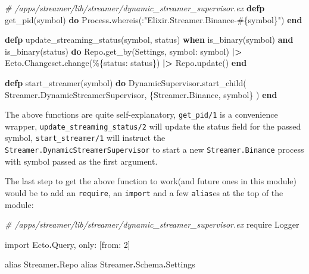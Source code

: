\documentclass[
  oneside]{book}
\newenvironment{Shaded}{\begin{snugshade}}{\end{snugshade}}
\newcommand{\CommentTok}[1]{\textcolor[rgb]{0.56,0.35,0.01}{\textit{#1}}}
\newcommand{\ConstantTok}[1]{\textcolor[rgb]{0.00,0.00,0.00}{#1}}
\newcommand{\DecValTok}[1]{\textcolor[rgb]{0.00,0.00,0.81}{#1}}
\newcommand{\ImportTok}[1]{#1}
\newcommand{\KeywordTok}[1]{\textcolor[rgb]{0.13,0.29,0.53}{\textbf{#1}}}
\newcommand{\NormalTok}[1]{#1}
\newcommand{\OperatorTok}[1]{\textcolor[rgb]{0.81,0.36,0.00}{\textbf{#1}}}
\newcommand{\OtherTok}[1]{\textcolor[rgb]{0.56,0.35,0.01}{#1}}
\newcommand{\StringTok}[1]{\textcolor[rgb]{0.31,0.60,0.02}{#1}}
\newcommand{\VariableTok}[1]{\textcolor[rgb]{0.00,0.00,0.00}{#1}}
\begin{document}
\begin{Shaded}
\begin{Highlighting}[]
\CommentTok{\# /apps/streamer/lib/streamer/dynamic\_streamer\_supervisor.ex}
  \KeywordTok{defp}\NormalTok{ get\_pid(symbol) }\KeywordTok{do}
    \ConstantTok{Process}\OperatorTok{.}\NormalTok{whereis(:}\StringTok{"Elixir.Streamer.Binance{-}}\OtherTok{\#\{}\NormalTok{symbol}\OtherTok{\}}\StringTok{"}\NormalTok{)}
  \KeywordTok{end}

  \KeywordTok{defp}\NormalTok{ update\_streaming\_status(symbol, status)}
       \KeywordTok{when}\NormalTok{ is\_binary(symbol) }\KeywordTok{and}\NormalTok{ is\_binary(status) }\KeywordTok{do}
    \ConstantTok{Repo}\OperatorTok{.}\NormalTok{get\_by(}\ConstantTok{Settings}\NormalTok{, }\VariableTok{symbol:}\NormalTok{ symbol)}
    \OperatorTok{|\textgreater{}} \ConstantTok{Ecto}\OperatorTok{.}\ConstantTok{Changeset}\OperatorTok{.}\NormalTok{change(\%\{}\VariableTok{status:}\NormalTok{ status\})}
    \OperatorTok{|\textgreater{}} \ConstantTok{Repo}\OperatorTok{.}\NormalTok{update()}
  \KeywordTok{end}

  \KeywordTok{defp}\NormalTok{ start\_streamer(symbol) }\KeywordTok{do}
    \ConstantTok{DynamicSupervisor}\OperatorTok{.}\NormalTok{start\_child(}
      \ConstantTok{Streamer}\OperatorTok{.}\ConstantTok{DynamicStreamerSupervisor}\NormalTok{,}
\NormalTok{      \{}\ConstantTok{Streamer}\OperatorTok{.}\ConstantTok{Binance}\NormalTok{, symbol\}}
\NormalTok{    )}
  \KeywordTok{end}
\end{Highlighting}
\end{Shaded}

The above functions are quite self-explanatory, \texttt{get\_pid/1} is a convenience wrapper, \texttt{update\_streaming\_status/2} will update the status field for the passed symbol, \texttt{start\_streamer/1} will instruct the \texttt{Streamer.DynamicStreamerSupervisor} to start a new \texttt{Streamer.Binance} process with symbol passed as the first argument.

The last step to get the above function to work(and future ones in this module) would be to add an \texttt{require}, an \texttt{import} and a few \texttt{alias}es at the top of the module:

\begin{Shaded}
\begin{Highlighting}[]
\CommentTok{\# /apps/streamer/lib/streamer/dynamic\_streamer\_supervisor.ex}
  \ImportTok{require} \ConstantTok{Logger}

  \ImportTok{import} \ConstantTok{Ecto}\OperatorTok{.}\ConstantTok{Query}\NormalTok{, }\VariableTok{only:}\NormalTok{ [}\VariableTok{from:} \DecValTok{2}\NormalTok{]}

  \ImportTok{alias} \ConstantTok{Streamer}\OperatorTok{.}\ConstantTok{Repo}
  \ImportTok{alias} \ConstantTok{Streamer}\OperatorTok{.}\ConstantTok{Schema}\OperatorTok{.}\ConstantTok{Settings}
\end{Highlighting}
\end{Shaded}
\end{document}
